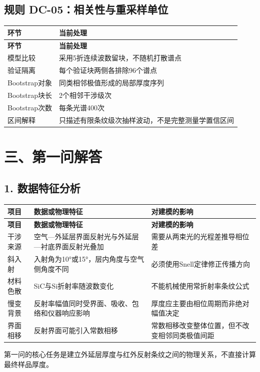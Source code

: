 \documentclass[11pt,a4paper]{ctexart}
\begin{document}
\subsection*{规则 DC-05：相关性与重采样单位}
\begin{center}
\scriptsize
\begin{longtable}{|>{\raggedright\arraybackslash}p{}|>{\raggedright\arraybackslash}p{}|}
\hline
\textbf{环节} & \textbf{当前处理} \\ \hline
\endfirsthead
\hline \textbf{环节} & \textbf{当前处理} \\ \hline
\endhead
模型比较 & 采用5折连续波数留块，不随机打散谱点 \\ \hline
验证隔离 & 每个验证块两侧各排除96个谱点 \\ \hline
Bootstrap对象 & 同类相邻极值形成的局部厚度序列 \\ \hline
Bootstrap块长 & 2个相邻干涉级次 \\ \hline
Bootstrap次数 & 每条光谱400次 \\ \hline
区间解释 & 只描述有限条纹级次抽样波动，不是完整测量学置信区间 \\ \hline
\end{longtable}
\normalsize
\end{center}
\section*{三、第一问解答}
\subsection*{1. 数据特征分析}
\begin{center}
\scriptsize
\begin{longtable}{|>{\raggedright\arraybackslash}p{}|>{\raggedright\arraybackslash}p{}|>{\raggedright\arraybackslash}p{}|}
\hline
\textbf{项目} & \textbf{数据或物理特征} & \textbf{对建模的影响} \\ \hline
\endfirsthead
\hline \textbf{项目} & \textbf{数据或物理特征} & \textbf{对建模的影响} \\ \hline
\endhead
干涉来源 & 空气—外延层界面反射光与外延层—衬底界面反射光叠加 & 需要从两束光的光程差推导相位差 \\ \hline
斜入射 & 入射角为10°或15°，层内角度与空气侧角度不同 & 必须使用Snell定律修正传播方向 \\ \hline
材料色散 & SiC与Si折射率随波数变化 & 不能机械使用常折射率条纹公式 \\ \hline
慢变背景 & 反射率幅值同时受界面、吸收、包络和仪器响应影响 & 厚度应主要由相位周期而非绝对幅值决定 \\ \hline
界面相移 & 反射界面可能引入常数相移 & 常数相移改变整体位置，但不改变相邻同类极值间距 \\ \hline
\end{longtable}
\normalsize
\end{center}
第一问的核心任务是建立外延层厚度与红外反射条纹之间的物理关系，不直接计算最终样品厚度。
\end{document}
